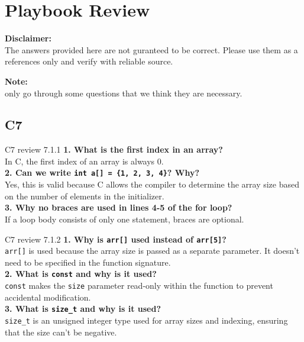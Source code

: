 \documentclass[
	11pt, %
]{beamer}
\begin{document}
\section{Playbook Review} %

\begin{frame}
	\textbf{Disclaimer:}\\
    The answers provided here are not guranteed to be correct. Please
    use them as a references only and verify with reliable source.

    \smallskip

    \textbf{Note:}\\
     only go through some questions that we think they are necessary.
	
\end{frame}

\subsection{C7}


\begin{frame}{C7 review 7.1.1}
    \textbf{1. What is the first index in an array?} \\
    In C, the first index of an array is always 0. \\
    \textbf{2. Can we write \texttt{int a[] = \{1, 2, 3, 4\}}? Why?} \\
    Yes, this is valid because C allows the compiler to determine the array size based on the number of elements in the initializer. \\
    \textbf{3. Why no braces are used in lines 4-5 of the for loop?} \\
    If a loop body consists of only one statement, braces are optional. \\
\end{frame}


\begin{frame}{C7 review 7.1.2}
    \textbf{1. Why is \texttt{arr[]} used instead of \texttt{arr[5]}?} \\
    \texttt{arr[]} is used because the array size is passed as a separate parameter. It doesn't need to be specified in the function signature. \\
    \textbf{2. What is \texttt{const} and why is it used?} \\
    \texttt{const} makes the \texttt{size} parameter read-only within the function to prevent accidental modification. \\
    \textbf{3. What is \texttt{size\_t} and why is it used?} \\
    \texttt{size\_t} is an unsigned integer type used for array sizes and indexing, ensuring that the size can't be negative. \\
\end{frame}
\end{document}
